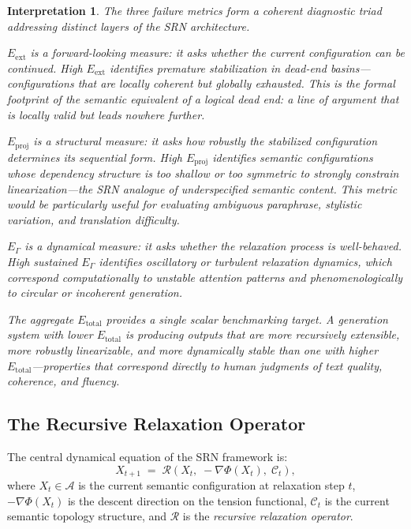 \documentclass[11pt, a4paper]{article}
\theoremstyle{srn}
\theoremstyle{srnremark}
\newtheorem{interpretation}{Interpretation}[section]
\newcommand{\Aspace}{\mathcal{A}}           %
\newcommand{\Cstruct}{\mathcal{C}}           %
\newcommand{\Rop}{\mathcal{R}}           %
\newcommand{\Phiten}{\varPhi}            %
\begin{document}
\begin{interpretation}
The three failure metrics form a coherent diagnostic triad addressing
distinct layers of the SRN architecture.

$E_{\mathrm{ext}}$ is a \emph{forward-looking} measure: it asks
whether the current configuration can be continued.
High $E_{\mathrm{ext}}$ identifies premature stabilization in dead-end
basins---configurations that are locally coherent but globally
exhausted.
This is the formal footprint of the semantic equivalent of a logical
dead end: a line of argument that is locally valid but leads nowhere
further.

$E_{\mathrm{proj}}$ is a \emph{structural} measure: it asks how
robustly the stabilized configuration determines its sequential form.
High $E_{\mathrm{proj}}$ identifies semantic configurations whose
dependency structure is too shallow or too symmetric to strongly
constrain linearization---the SRN analogue of underspecified semantic
content.
This metric would be particularly useful for evaluating ambiguous
paraphrase, stylistic variation, and translation difficulty.

$E_{\Gamma}$ is a \emph{dynamical} measure: it asks whether the
relaxation process is well-behaved.
High sustained $E_{\Gamma}$ identifies oscillatory or turbulent
relaxation dynamics, which correspond computationally to unstable
attention patterns and phenomenologically to circular or incoherent
generation.

The aggregate $E_{\mathrm{total}}$ provides a single scalar
benchmarking target.
A generation system with lower $E_{\mathrm{total}}$ is producing
outputs that are more recursively extensible, more robustly
linearizable, and more dynamically stable than one with higher
$E_{\mathrm{total}}$---properties that correspond directly to
human judgments of text quality, coherence, and fluency.
\end{interpretation}

\subsection{The Recursive Relaxation Operator}

The central dynamical equation of the SRN framework is:
\begin{equation}
  \label{eq:relaxation}
  X_{t+1}
  \;=\;
  \Rop\!\left(X_t,\; -\nabla\Phiten(X_t),\; \Cstruct_t\right),
\end{equation}
where $X_t \in \Aspace$ is the current semantic configuration at relaxation
step $t$, $-\nabla\Phiten(X_t)$ is the descent direction on the tension
functional, $\Cstruct_t$ is the current semantic topology structure, and
$\Rop$ is the \emph{recursive relaxation operator}.
\end{document}
